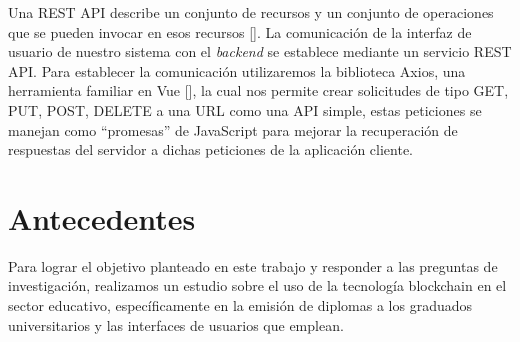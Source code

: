 
Una REST API describe un conjunto de recursos y un conjunto de operaciones que se pueden invocar en esos recursos [\cite{56}]. La comunicación de la interfaz de usuario de nuestro sistema con el \textit{backend} se establece mediante un servicio REST API. Para establecer la comunicación utilizaremos la biblioteca Axios, una herramienta familiar en Vue [\cite{46}], la cual nos permite crear solicitudes de tipo GET, PUT, POST, DELETE a una URL como una API  simple, estas peticiones se manejan como ``promesas'' de JavaScript para mejorar la recuperación de respuestas del servidor a dichas peticiones de la aplicación cliente.


\section{Antecedentes}

Para lograr el objetivo planteado en este trabajo y responder a las preguntas de investigación, realizamos un estudio sobre el uso de la tecnología blockchain en el sector educativo, específicamente en la emisión de diplomas a los graduados universitarios y las interfaces de usuarios que emplean.


